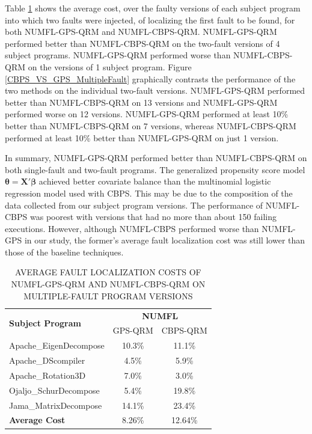 Table \ref{table6} shows the average cost, over the faulty versions of each subject program into which two faults were injected, of localizing the first fault to be found, for both NUMFL-GPS-QRM and NUMFL-CBPS-QRM.  NUMFL-GPS-QRM performed better than NUMFL-CBPS-QRM on the two-fault versions of 4 subject programs. NUMFL-GPS-QRM performed worse than NUMFL-CBPS-QRM on the versions of 1 subject program.  Figure \ref{CBPS_VS_GPS_MultipleFault} graphically contrasts the performance of the two methods on the individual two-fault versions.  NUMFL-GPS-QRM performed better than NUMFL-CBPS-QRM on 13 versions and NUMFL-GPS-QRM performed worse on 12 versions.  NUMFL-GPS-QRM performed at least 10\% better than NUMFL-CBPS-QRM on 7 versions, whereas NUMFL-CBPS-QRM performed at least 10\% better than NUMFL-GPS-QRM on just 1 version.

In summary, NUMFL-GPS-QRM performed better than NUMFL-CBPS-QRM on both single-fault and two-fault programs.  The generalized propensity score model $\pmb{\theta}=\pmb{X}'\pmb{\beta}$ achieved better covariate balance than the multinomial logistic regression model used with CBPS.  This may be due to the composition of the data collected from our subject program versions.  The performance of NUMFL-CBPS was poorest with versions that had no more than about 150 failing executions.  However, although NUMFL-CBPS performed worse than NUMFL-GPS in our study, the former's average fault localization cost was still lower than those of the baseline techniques.
\begin{table}[htbp!]
\caption{AVERAGE FAULT LOCALIZATION COSTS OF NUMFL-GPS-QRM AND NUMFL-CBPS-QRM ON MULTIPLE-FAULT PROGRAM VERSIONS}
\label{table6}
\centering
      \begin{tabular}{|l|c|c|}
      \hline
\multirow{2}{*}{{\bf Subject Program}}	&	\multicolumn{2}{|c|}{{\bf NUMFL}}	\\	\cline{2-3}
&  GPS-QRM	&CBPS-QRM \\ \hline
Apache\_EigenDecompose	&	10.3\%	&	11.1\%	\\	\hline
Apache\_DScompiler	&	4.5\%	&	5.9\%	\\	\hline
Apache\_Rotation3D	&	7.0\%	&	3.0\%	\\	\hline
Ojaljo\_SchurDecompose	&	5.4\%	&	19.8\%	\\	\hline
Jama\_MatrixDecompose	&	14.1\%	&	23.4\%	\\	\hline
{\bf Average Cost} & 8.26\% &12.64\%\\ \hline
\end{tabular}
\end{table}

